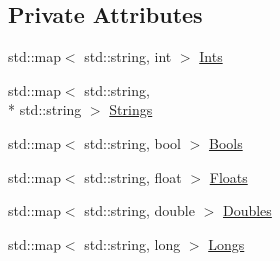 \subsection*{Private Attributes}
\begin{DoxyCompactItemize}
\item 
std\-::map$<$ std\-::string, int $>$ \hyperlink{class_producer_package_a9e9986063d53046485a3ec1faac95426}{Ints}
\item 
std\-::map$<$ std\-::string, \\*
std\-::string $>$ \hyperlink{class_producer_package_aaff12a94ce8d3659e6258d03d6a6121a}{Strings}
\item 
std\-::map$<$ std\-::string, bool $>$ \hyperlink{class_producer_package_a469d2ff5c8995155c4ea3047e000e031}{Bools}
\item 
std\-::map$<$ std\-::string, float $>$ \hyperlink{class_producer_package_a255443b4b56e2b9e5d012d567f08ab1a}{Floats}
\item 
std\-::map$<$ std\-::string, double $>$ \hyperlink{class_producer_package_a39d4f108a360af494d93a62b2fab66e8}{Doubles}
\item 
std\-::map$<$ std\-::string, long $>$ \hyperlink{class_producer_package_a40a935d0c8cf30f70c30491ca063c750}{Longs}
\end{DoxyCompactItemize}


